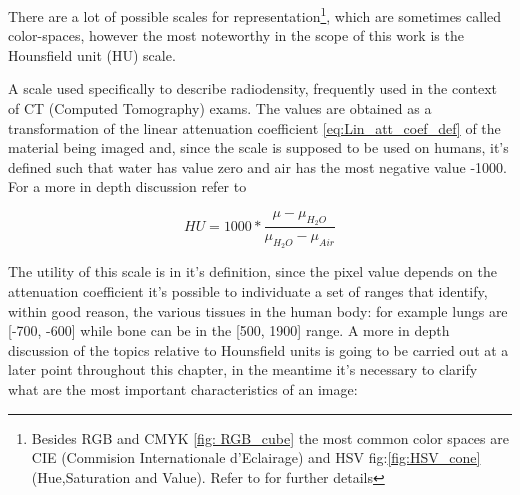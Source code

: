 There are a lot of possible scales for representation\footnote{Besides RGB and CMYK \ref{fig: RGB_cube} the most common color spaces are CIE (Commision Internationale d’Eclairage) and HSV fig:\ref{fig:HSV_cone} (Hue,Saturation and Value). Refer to \cite{Color_spaces} for further details}, which are sometimes called color-spaces, however the most noteworthy in the scope of this work is the Hounsfield unit (HU) scale.

\begin{definition}
A scale used specifically to describe radiodensity, frequently used in the context of CT (Computed Tomography) exams. The values are obtained as a transformation of the linear attenuation coefficient \ref{eq:Lin_att_coef_def} of the material being imaged and, since the scale is supposed to be used on humans, it's defined such that water has value zero and air has the most negative value -1000. For  a more in depth discussion refer to \cite{Hounsfield}
\end{definition}

\begin{equation}\label{eq:HU_def}
    HU = 1000*\frac{\mu - \mu_{H_2O}}{\mu_{H_2O} - \mu_{Air}}
\end{equation}

The utility of this scale is in it's definition, since the pixel value depends on the attenuation coefficient it's possible to individuate a set of ranges that identify, within good reason, the various  tissues in the human body: for example lungs are [-700, -600] while bone can be in the [500, 1900] range.
A more in depth discussion of the topics relative to Hounsfield units is going to be carried out at a later point throughout this chapter, in the meantime it's necessary to clarify what are the most important characteristics of an image:

